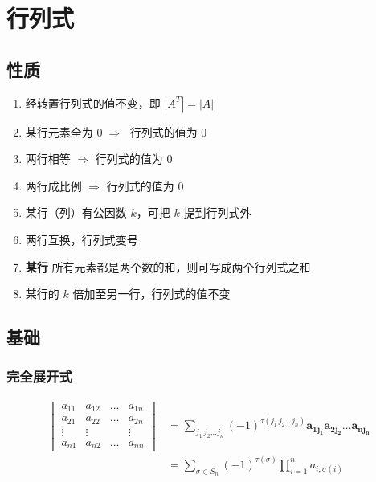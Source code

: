 \documentclass[a4paper,12pt]{article}
\begin{document}



    \section{行列式}

    \subsection{性质}

    \begin{enumerate}
        \item 经转置行列式的值不变，即 $|A^T| = |A|$
        \item 某行元素全为 $0 \;\Rightarrow\;$ 行列式的值为 0
        \item 两行相等 $\Rightarrow$ 行列式的值为 0
        \item 两行成比例 $\Rightarrow$ 行列式的值为 0
        \item 某行（列）有公因数 $k$，可把 $k$ 提到行列式外
        \item 两行互换，行列式变号
        \item \textbf{某行} 所有元素都是两个数的和，则可写成两个行列式之和
        \item 某行的 $k$ 倍加至另一行，行列式的值不变
    \end{enumerate}

    \subsection{基础}

    \subsubsection{完全展开式}

    \begin{align*}
        \begin{vmatrix}
            a_{11} & a_{12} & \dots & a_{1n} \\
            a_{21} & a_{22} & \dots & a_{2n} \\
            \vdots & \vdots &       & \vdots \\
            a_{n1} & a_{n2} & \dots & a_{nn}
        \end{vmatrix}
        &= \sum_{j_1\,j_2\dots j_{n}} (-1)^{\tau(j_1\,j_2\dots j_n)} \mathbf{a_{1j_1}a_{2j_2}\dots a_{nj_n}} \\
        &= \sum_{\sigma \in S_n} (-1)^{\tau(\sigma)} \prod_{i=1}^{n} a_{i, \sigma(i)}
    \end{align*}
\end{document}
